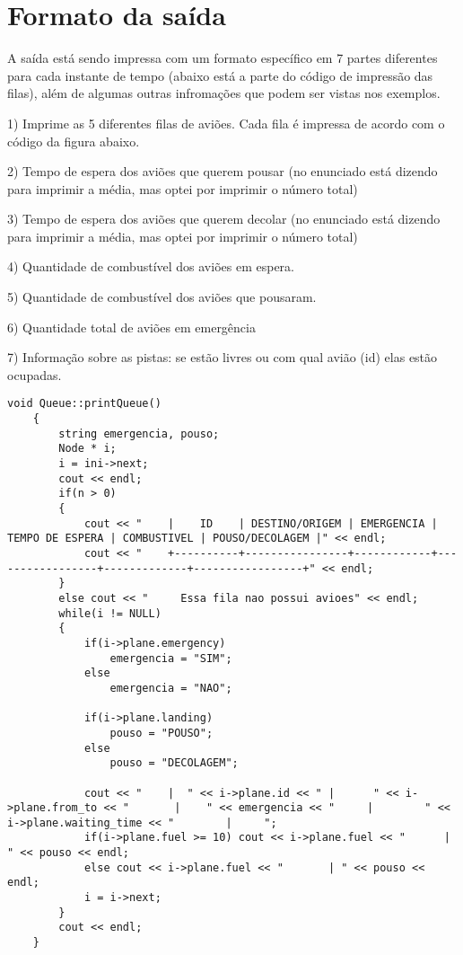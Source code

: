 \documentclass[a4paper,11pt]{article}
\theoremstyle{mytheor}
\begin{document}
\section*{Formato da saída} 

A saída está sendo impressa com um formato específico em 7 partes diferentes  para cada instante de tempo (abaixo está a parte do código de impressão das filas), além de algumas outras infromações que podem ser vistas nos exemplos.\newline

1) Imprime as 5 diferentes filas de aviões. Cada fila é impressa de acordo com o código da figura abaixo. \newline

2) Tempo de espera dos aviões que querem pousar (no enunciado está dizendo para imprimir a média, mas optei por imprimir o número total)\newline

3) Tempo de espera dos aviões que querem decolar (no enunciado está dizendo para imprimir a média, mas optei por imprimir o número total)\newline

4) Quantidade de combustível dos aviões em espera. \newline

5) Quantidade de combustível dos aviões que pousaram.\newline

6) Quantidade total de aviões em emergência \newline

7) Informação sobre as pistas: se estão livres ou com qual avião (id) elas estão ocupadas.\newline

\begin{lstlisting}[label={list:first},caption= Parte do código em queue.h que imprime informações dos aviões (C++).]
    void Queue::printQueue()
    {
        string emergencia, pouso;
        Node * i;
        i = ini->next;
        cout << endl;
        if(n > 0)
        { 
            cout << "    |    ID    | DESTINO/ORIGEM | EMERGENCIA | TEMPO DE ESPERA | COMBUSTIVEL | POUSO/DECOLAGEM |" << endl;
            cout << "    +----------+----------------+------------+-----------------+-------------+-----------------+" << endl;
        }
        else cout << "     Essa fila nao possui avioes" << endl;
        while(i != NULL)
        {
            if(i->plane.emergency)
                emergencia = "SIM";
            else
                emergencia = "NAO";

            if(i->plane.landing)
                pouso = "POUSO";
            else
                pouso = "DECOLAGEM";
            
            cout << "    |  " << i->plane.id << " |      " << i->plane.from_to << "       |    " << emergencia << "     |        " << i->plane.waiting_time << "        |     ";
            if(i->plane.fuel >= 10) cout << i->plane.fuel << "      | " << pouso << endl;
            else cout << i->plane.fuel << "       | " << pouso << endl;
            i = i->next;
        }
        cout << endl;
    }   
\end{lstlisting}
\end{document}
